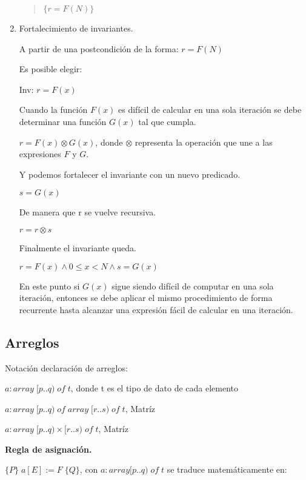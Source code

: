 \documentclass[hidelinks]{article}
\newenvironment{absolutelynopagebreak}
{\Needspace{10\baselineskip}\begin{quote}}
		{\end{quote}}
\begin{document}
\begin{enumerate}
\begin{absolutelynopagebreak}
		      $\{r = F(N)\}$\par
	      \end{absolutelynopagebreak}
	\item Fortalecimiento de invariantes.\par
	      A partir de una postcondición de la forma: $r = F(N)$\par
	      Es posible elegir:\par
	      Inv: $r = F(x)$\par
	      Cuando la función $F(x)$ es difícil de calcular en una sola iteración se debe
	      determinar una función $G(x)$ tal que cumpla.\par
	      $r = F(x) \otimes G(x)$, donde $\otimes$ representa la operación que une a las expresiones $F$ y $G$.\par
	      Y podemos fortalecer el invariante con un nuevo predicado.\par
	      $s = G(x)$\par
	      De manera que r se vuelve recursiva.\par
	      $r = r \otimes s$\par
	      Finalmente el invariante queda.\par
	      $r = F(x) \land 0 \leq x < N \land s = G(x)$\par
	      En este punto si $G(x)$ sigue siendo difícil de computar en una sola iteración,
	      entonces se debe aplicar el mismo procedimiento de forma recurrente hasta
	      alcanzar una expresión fácil de calcular en una iteración.\par
\end{enumerate}

\subsection{Arreglos}\par

Notación declaración de arreglos:\par
$a: array \; [p..q) \; of \; t$, donde t es el tipo de dato de cada elemento\par
$a: array \; [p..q) \; of \; array \; [r..s) \; of \; t$, Matríz\par
$a: array \; [p..q) \times [r..s) \; of \; t$, Matríz\par

\textbf{Regla de asignación.}\par

$\{P\} \; a[E] := F \; \{Q\}$, con $a: array [p..q) \; of \; t$ se traduce matemáticamente en:\par
\end{document}
